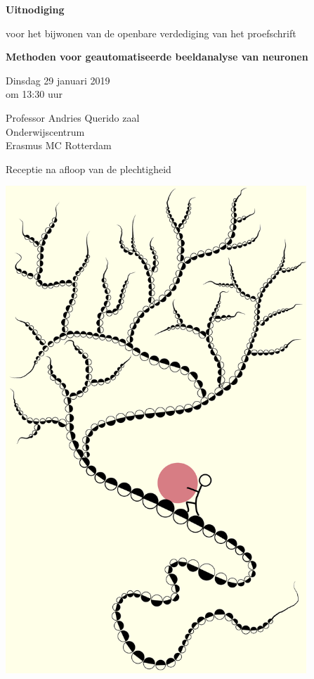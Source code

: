 \documentclass[10pt]{report}
\begin{document}
\pagestyle{empty}
\setlength{\leftmargini}{0em}

\begin{center}
	
  	{\Large\bf Uitnodiging}

  	\bigskip

  	voor het bijwonen van de openbare verdediging van het proefschrift

  	\bigskip
  	\bigskip
	
  
  	{\Large\bf  Methoden voor geautomatiseerde beeldanalyse van neuronen}

  	\bigskip
  	\bigskip
  
  	Dinsdag 29 januari 2019\\om 13:30 uur
  
  	\bigskip
  	\bigskip
  
  	Professor Andries Querido zaal\\
  	Onderwijscentrum\\%
  	Erasmus MC Rotterdam
  
  	\bigskip
  	\bigskip
  
 	Receptie na afloop van de plechtigheid
  
 	\bigskip
 	\bigskip

	\includegraphics[width=0.85\textwidth]{syziphus}


\end{center}
\end{document}
